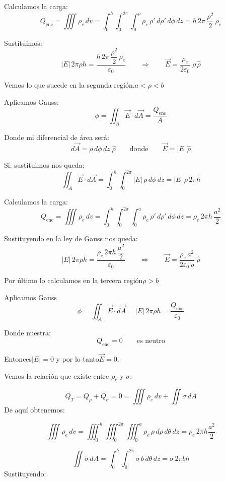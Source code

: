 \documentclass[a4paper,12pt]{article}
\begin{document}
\noindent
Calculamos la carga:
\[
Q_{\text{enc}}
=\iiint \rho_{e}\,dv
=\int_{0}^{h}\!\!\int_{0}^{2\pi}\!\!\int_{0}^{\rho}
\rho_{e}\,\rho'\, d\rho'\, d\phi\, dz
=h\,2\pi\,\frac{\rho^{2}}{2}\,\rho_{e}
\]

\noindent
Sustituimos:
\[
|E|\,2\pi\rho h
=\frac{h\,2\pi\,\dfrac{\rho^{2}}{2}\,\rho_{e}}{\varepsilon_{0}}
\qquad\Longrightarrow\qquad
\vec{E}=\frac{\rho_{e}}{2\varepsilon_{0}}\;\rho\,\hat{\rho}
\]

\bigskip
\noindent
Vemos lo que sucede en la segunda región.\quad $a<\rho<b$

\medskip
\noindent
Aplicamos Gauss:
\[
\phi=\iint_{A} \vec{E}\cdot d\vec{A}
=\frac{Q_{\text{enc}}}{A}
\]

\noindent
Donde mi diferencial de área será:
\[
d\vec{A}=\rho\, d\phi\, dz\;\hat{\rho}
\qquad\text{donde}\qquad
\vec{E}=|E|\,\hat{\rho}
\]

\noindent
Si: sustituimos nos queda:
\[
\iint_{A} \vec{E}\cdot d\vec{A}
=\int_{0}^{h}\!\!\int_{0}^{2\pi} |E|\,\rho\, d\phi\, dz
=|E|\,\rho\,2\pi h
\]

\noindent
Calculamos la carga:
\[
Q_{\text{enc}}
=\iiint \rho_{e}\,dv
=\int_{0}^{h}\!\!\int_{0}^{2\pi}\!\!\int_{0}^{a}
\rho_{e}\,\rho'\, d\rho'\, d\phi\, dz
=\rho_{e}\,2\pi h\,\frac{a^{2}}{2}
\]

\noindent
Sustituyendo en la ley de Gauss nos queda:
\[
|E|\,2\pi\rho h=\frac{\rho_{e}\,2\pi h\,\dfrac{a^{2}}{2}}{\varepsilon_{0}}
\qquad\Longrightarrow\qquad
\vec{E}=\frac{\rho_{e}\,a^{2}}{2\varepsilon_{0}\,\rho}\;\hat{\rho}
\]

\bigskip
\noindent
Por último lo calculamos en la tercera región\quad $\rho>b$

\noindent
Aplicamos Gauss
\[
\phi=\iint_{A}\vec{E}\cdot d\vec{A}
=|E|\,2\pi \rho h
=\frac{Q_{\text{enc}}}{\varepsilon_{0}}
\]


\newpage
\noindent
Donde nuestra:
\[
Q_{\text{enc}}=0
\qquad\text{es neutro}
\]

\noindent
Entonces\quad $|E|=0$ y por lo tanto\quad $\vec{E}=0$.

\medskip
\noindent
Vemos la relación que existe entre $\rho_e$ y $\sigma$:

\[
Q_T = Q_\rho + Q_\sigma = 0 = \iiint \rho_e \, dv + \iint \sigma \, dA
\]
De aquí obtenemos:

\[
\iiint \rho_e \, dv = \iiint_{0}^{h} \iiint_{0}^{2\pi} \iiint_{0}^{a} \rho_e \, \rho \, d\rho \, d\theta \, dz = \rho_e \, 2\pi h \frac{a^2}{2}
\]

\[
\iint \sigma \, dA = \int_{0}^{h} \int_{0}^{2\pi} \sigma \, b \, d\theta \, dz = \sigma \, 2\pi b h
\]
Sustituyendo:
\end{document}
